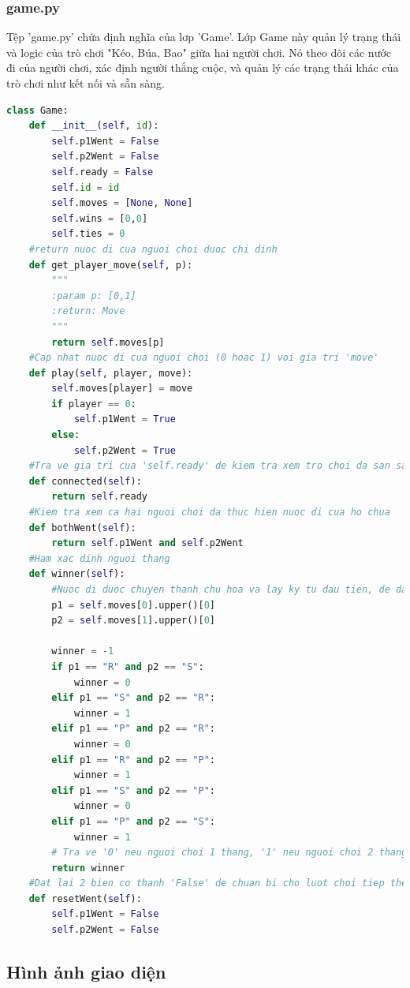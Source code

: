 \documentclass[a4paper]{article}
\begin{document}
\subsubsection{game.py}
Tệp 'game.py' chứa định nghĩa của lơp 'Game'. Lớp Game này quản lý trạng thái và logic của trò chơi "Kéo, Búa, Bao" giữa hai người chơi. Nó theo dõi các nước đi của người chơi, xác định người thắng cuộc, và quản lý các trạng thái khác của trò chơi như kết nối và sẵn sàng.
\begin{mdframed}[hidealllines=true,backgroundcolor=magenta!10]
	\begin{lstlisting}[language=Python]
class Game:
    def __init__(self, id):
        self.p1Went = False
        self.p2Went = False
        self.ready = False
        self.id = id
        self.moves = [None, None]
        self.wins = [0,0]
        self.ties = 0
    #return nuoc di cua nguoi choi duoc chi dinh
    def get_player_move(self, p): 
        """
        :param p: [0,1]
        :return: Move
        """
        return self.moves[p]
    #Cap nhat nuoc di cua nguoi choi (0 hoac 1) voi gia tri 'move'
    def play(self, player, move):
        self.moves[player] = move
        if player == 0:
            self.p1Went = True
        else:
            self.p2Went = True
    #Tra ve gia tri cua 'self.ready' de kiem tra xem tro choi da san sang chua
    def connected(self):
        return self.ready
    #Kiem tra xem ca hai nguoi choi da thuc hien nuoc di cua ho chua
    def bothWent(self):
        return self.p1Went and self.p2Went
    #Ham xac dinh nguoi thang
    def winner(self):
        #Nuoc di duoc chuyen thanh chu hoa va lay ky tu dau tien, de dam bao rang no la 'R;, 'P' hoac 'S'
        p1 = self.moves[0].upper()[0]
        p2 = self.moves[1].upper()[0]

        winner = -1
        if p1 == "R" and p2 == "S":
            winner = 0
        elif p1 == "S" and p2 == "R":
            winner = 1
        elif p1 == "P" and p2 == "R":
            winner = 0
        elif p1 == "R" and p2 == "P":
            winner = 1
        elif p1 == "S" and p2 == "P":
            winner = 0
        elif p1 == "P" and p2 == "S":
            winner = 1
        # Tra ve '0' neu nguoi choi 1 thang, '1' neu nguoi choi 2 thang va '-1' neu hoa
        return winner
    #Dat lai 2 bien co thanh 'False' de chuan bi cho luot choi tiep theo
    def resetWent(self):
        self.p1Went = False
        self.p2Went = False
	\end{lstlisting}
	\end{mdframed}
\subsection{Hình ảnh giao diện}
\end{document}
